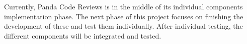 
Currently, Panda Code Reviews is in the middle of its individual components
implementation phase. The next phase of this project focuses on finishing the
development of these and test them individually. After individual testing, the
different components will be integrated and tested.